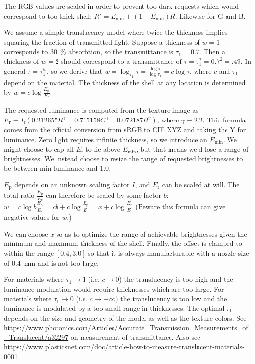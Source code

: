 The RGB values are scaled in order to prevent too dark requests which would correspond to too thick shell: $R' = E_\text{min} +  (1 - E_\text{min}) R$.
Likewise for G and B.

We assume a simple translucency model where twice the thickness implies squaring the fraction of transmitted light.
Suppose a thickness of $w=1$ corresponds to \SI{30}{\percent} absorbtion, so the transmittance is $\tau_1 = 0.7$.
Then a thickness of $w=2$ should correspond to a transmittance of $\tau = \tau_1^2 = 0.7^2 = .49$.
In general $\tau = \tau_1^w$, so we derive that $w = \log_{\tau_1} \tau = \frac{\log \tau}{\log \tau_1} = c \log \tau$,
where $c$ and $\tau_1$ depend on the material.
The thickness of the shell at any location is determined by $w = c \log \frac{E_\text{p}}{E_\text{r}}$.

The requested luminance is computed from the texture image as $E_\text{r} = I_\text{r} \left( 0.212655 R^\gamma + 0.715158 G^\gamma + 0.072187 B ^\gamma \right)$, where $\gamma = 2.2$.
This formula comes from the official conversion from sRGB to CIE XYZ and taking the Y for luminance.
Zero light requires infinite thickness, so we introduce an $E_\text{min}$.
We might choose to cap all $E_\text{r}$ to lie above $E_\text{min}$, but that means we'd lose a range of brightnesses.
We instead choose to resize the range of requested brightnesses to be between min luminance and $1.0$.

$E_\text{p}$ depends on an unknown scaling factor $I$, and $E_\text{r}$ can be scaled at will.
The total ratio $\frac{E_\text{p}}{E_\text{r}}$ can therefore be scaled by some factor $b$:
$w = c \log b \frac{E_\text{p}}{E_\text{r}} = cb + c \log \frac{E_\text{p}}{E_\text{r}} = x + c \log \frac{E_\text{p}}{E_\text{r}}$
(Beware this formula can give negative values for $w$.)

We can choose $x$ so as to optimize the range of achievable brightnesses given the minimum and maximum thickness of the shell.
Finally, the offset is clamped to within the range $[0.4, 3.0]$ so that it is always manufacturable with a nozzle size of \SI{0.4}{\milli\meter} and is not too large.

For materials where $\tau_1 \to 1$ (i.e. $c \to 0$) the translucency is too high and the luminance modulation would require thicknesses which are too large.
For materials where $\tau_1 \to 0$ (i.e. $c \to -\infty)$ the translucency is too low and the luminance is modulated by a too small range in thicknesses.
The optimal $\tau_1$ depends on the size and geometry of the model as well as the texture colors.
See \url{https://www.photonics.com/Articles/Accurate_Transmission_Measurements_of_Translucent/a32297} on measurement of transmittance.
Also see \url{https://www.plasticsnet.com/doc/article-how-to-measure-translucent-materials-0001}


